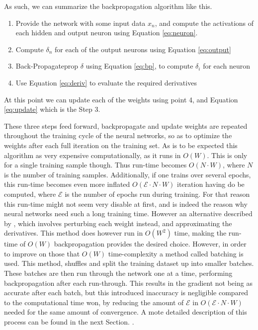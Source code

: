 As such, we can summarize the backpropagation algorithm like this.

\begin{enumerate}
    \item

        Provide the network with some input data $x_n$, and compute the
        activations of each hidden and output neuron using Equation
        \eqref{eq:neuron}.

    \item

        Compute $\delta_n$ for each of the output neurons using Equation
        \eqref{eq:output}

    \item

        Back-Propagateprop $\delta$ using Equation \eqref{eq:bp}, to compute
        $\delta_i$ for each neuron

    \item

        Use Equation \eqref{eq:deriv} to evaluate the required derivatives

\end{enumerate}

At this point we can update each of the weights using point 4, and Equation
\eqref{eq:update} which is the Step 3.

These three steps feed forward, backpropagate and update weights are repeated
throughout the training cycle of the neural networks, so as to optimize the
weights after each full iteration on the training set. As is to be expected
this algorithm as very expensive computationally, as it runs in $O(W)$. This is
only for a single training sample though. Thus run-time becomes $O(N\cdot W)$,
where $N$ is the number of training samples. Additionally, if one trains over
several epochs, this run-time becomes even more inflated $O(\mathcal{E}\cdot
N\cdot W)$ iteration having do be computed, where $\mathcal{E}$ is the number
of epochs run during training. For that reason this run-time might not seem
very disable at first, and is indeed the reason why neural networks need such a
long training time. However an alternative described by \citet{Bishop}, which
involves perturbing each weight instead, and approximating the derivatives.
This method does however run in $O(W^2)$ time, making the run-time of $O(W)$
backpropagation provides the desired choice. However, in order to improve
on those that $O(W)$ time-complexity a method called batching is used. This
method, shuffles and split the training dataset up into smaller batches.
These batches are then run through the network one at a time, performing
backpropagation after each run-through. This results in the gradient not being
as accurate after each batch, but this introduced inaccuracy is negligible
compared to the computational time won, by reducing the amount of $\mathcal{E}$
in $O(\mathcal{E}\cdot N\cdot W)$ needed for the same amount of convergence.
A mote detailed description of this process can be found in the next Section.
\citep{Bishop}.


